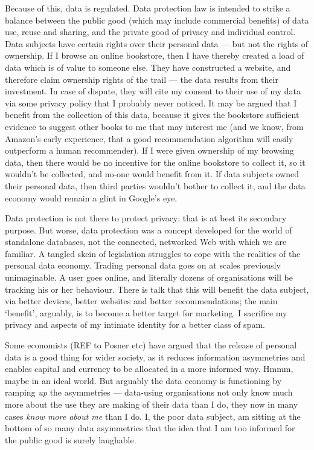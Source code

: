 \documentclass[graybox]{svmult}
\begin{document}
Because of this, data is regulated. Data protection law is intended to strike a balance between the public good (which may include commercial benefits) of data use, reuse and sharing, and the private good of privacy and individual control. Data subjects have certain rights over their personal data --- but not the rights of ownership. If I browse an online bookstore, then I have thereby created a load of data which is of value to someone else. They have constructed a website, and therefore claim ownership rights of the trail --- the data results from their investment. In case of dispute, they will cite my consent to their use of my data via some privacy policy that I probably never noticed. It may be argued that I benefit from the collection of this data, because it gives the bookstore sufficient evidence to suggest other books to me that may interest me (and we know, from Amazon's early experience, that a good recommendation algorithm will easily outperform a human recommender). If I were given ownership of my browsing data, then there would be no incentive for the online bookstore to collect it, so it wouldn't be collected, and no-one would benefit from it. If data subjects owned their personal data, then third parties wouldn't bother to collect it, and the data economy would remain a glint in Google's eye.

Data protection is not there to protect privacy; that is at best its secondary purpose. But worse, data protection was a concept developed for the world of standalone databases, not the connected, networked Web with which we are familiar. A tangled skein of legislation struggles to cope with the realities of the personal data economy. Trading personal data goes on at scales previously unimaginable. A user goes online, and literally dozens of organisations will be tracking his or her behaviour. There is talk that this will benefit the data subject, via better devices, better websites and better recommendations; the main `benefit', arguably, is to become a better target for marketing. I sacrifice my privacy and aspects of my intimate identity for a better class of spam.

Some economists (REF to Posner etc) have argued that the release of personal data is a good thing for wider society, as it reduces information asymmetries and enables capital and currency to be allocated in a more informed way. Hmmm, maybe in an ideal world. But arguably the data economy is functioning by ramping {\em up} the asymmetries --- data-using organisations not only know much more about the use they are making of their data than I do, they now in many cases {\em know more about me} than I do. I, the poor data subject, am sitting at the bottom of so many data asymmetries that the idea that I am too informed for the public good is surely laughable.
\end{document}
